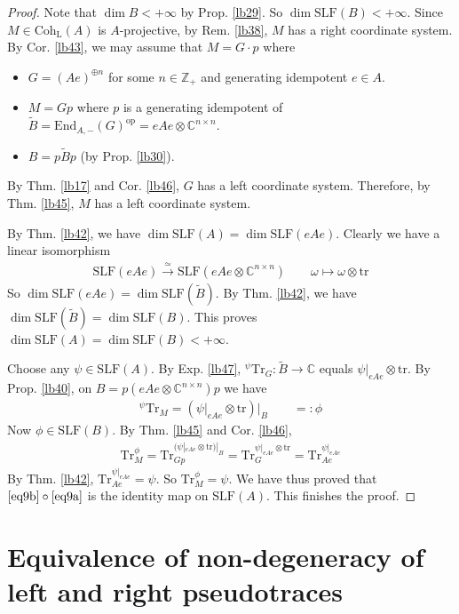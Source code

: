 \documentclass[11pt,b5paper,notitlepage]{article}
\theoremstyle{definition}
\theoremstyle{plain}
\newcommand{\wtd}{\widetilde}
\newcommand{\Tr}{\mathrm{Tr}}
\newcommand{\End}{\mathrm{End}} %
\newcommand{\opp}{\mathrm{op}}
\newcommand{\Cbb}{\mathbb C}
\newcommand{\Zbb}{\mathbb Z}
\newcommand{\Coh}{\mathrm{Coh}_{\mathrm L}}
\newcommand{\SLF}{\mathrm{SLF}}
\newcommand{\trc}{\mathrm{tr}}
\numberwithin{equation}{section}
\begin{document}
\begin{proof}
Note that $\dim B<+\infty$ by Prop. \ref{lb29}. So $\dim\SLF(B)<+\infty$. Since $M\in\Coh(A)$ is $A$-projective, by Rem. \ref{lb38}, $M$ has a right coordinate system.  By Cor. \ref{lb43}, we may assume that $M=G\cdot p$ where 
\begin{itemize}
\item $G=(Ae)^{\oplus n}$ for some $n\in\Zbb_+$ and generating idempotent $e\in A$.
\item $M=Gp$ where $p$ is a generating idempotent of $\wtd B=\End_{A,-}(G)^\opp=eAe\otimes\Cbb^{n\times n}$.
\item $B=p\wtd Bp$ (by Prop. \ref{lb30}).
\end{itemize}
By Thm. \ref{lb17} and Cor. \ref{lb46}, $G$ has a left coordinate system. Therefore, by Thm. \ref{lb45}, $M$ has a left coordinate system.

By Thm. \ref{lb42}, we have $\dim\SLF(A)=\dim\SLF(eAe)$. Clearly we have a linear isomorphism
\begin{align*}
\SLF(eAe)\xrightarrow{\simeq}\SLF(eAe\otimes\Cbb^{n\times n})\qquad \omega\mapsto\omega\otimes\trc
\end{align*}
So $\dim\SLF(eAe)=\dim\SLF(\wtd B)$. By Thm. \ref{lb42}, we have $\dim\SLF(\wtd B)=\dim\SLF(B)$. This proves $\dim\SLF(A)=\dim\SLF(B)<+\infty$.

Choose any $\psi\in\SLF(A)$. By Exp. \ref{lb47}, ${}^\psi\Tr_G:\wtd B\rightarrow\Cbb$ equals $\psi|_{eAe}\otimes\trc$. By Prop. \ref{lb40}, on $B=p(eAe\otimes\Cbb^{n\times n})p$ we have
\begin{align*}
{}^\psi\Tr_M=(\psi|_{eAe}\otimes\trc)\big|_B\qquad=:\phi
\end{align*}
Now $\phi\in\SLF(B)$. By Thm. \ref{lb45} and Cor. \ref{lb46},
\begin{align*}
\Tr_M^\phi=\Tr_{Gp}^{(\psi|_{eAe}\otimes\trc)|_B}=\Tr_G^{\psi|_{eAe}\otimes\trc}=\Tr_{Ae}^{\psi|_{eAe}}
\end{align*}
By Thm. \ref{lb42}, $\Tr_{Ae}^{\psi|_{eAe}}=\psi$. So $\Tr_M^\phi=\psi$. We have thus proved that $\eqref{eq9b}\circ\eqref{eq9a}$ is the identity map on $\SLF(A)$. This finishes the proof.
\end{proof}






\section{Equivalence of non-degeneracy of left and right pseudotraces}
\end{document}
